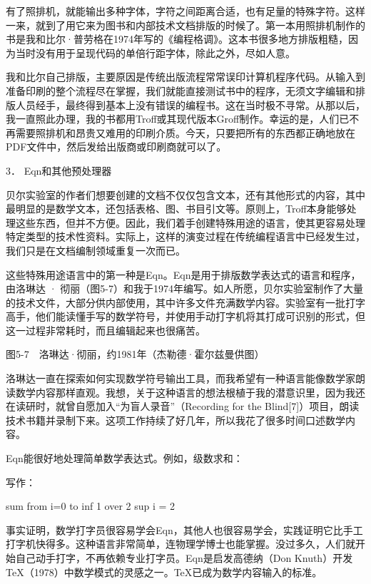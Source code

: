 \documentclass[a4paper,12pt,UTF8,twoside]{ctexbook}
\begin{document}
{{有了照排机，就能输出多种字体，字符之间距离合适，也有足量的特殊字符。这样一来，就到了用它来为图书和内部技术文档排版的时候了。第一本用照排机制作的书是我和比尔·普劳格在1974年写的《编程格调》。这本书很多地方排版粗糙，因为当时没有用于呈现代码的单倍行距字体，除此之外，尽如人意。

我和比尔自己排版，主要原因是传统出版流程常常误印计算机程序代码。从输入到准备印刷的整个流程尽在掌握，我们就能直接测试书中的程序，无须文字编辑和排版人员经手，最终得到基本上没有错误的编程书。这在当时极不寻常。从那以后，我一直照此办理，我的书都用Troff或其现代版本Groff制作。幸运的是，人们已不再需要照排机和昂贵又难用的印刷介质。今天，只要把所有的东西都正确地放在PDF文件中，然后发给出版商或印刷商就可以了。





3． Eqn和其他预处理器


贝尔实验室的作者们想要创建的文档不仅仅包含文本，还有其他形式的内容，其中最明显的是数学文本，还包括表格、图、书目引文等。原则上，Troff本身能够处理这些东西，但并不方便。因此，我们着手创建特殊用途的语言，使其更容易处理特定类型的技术性资料。实际上，这样的演变过程在传统编程语言中已经发生过，我们只是在文档编制领域重复一次而已。

这些特殊用途语言中的第一种是Eqn。Eqn是用于排版数学表达式的语言和程序，由洛琳达 · 彻丽（图5-7）和我于1974年编写。如人所愿，贝尔实验室制作了大量的技术文件，大部分供内部使用，其中许多文件充满数学内容。实验室有一批打字高手，他们能读懂手写的数学符号，并使用手动打字机将其打成可识别的形式，但这一过程非常耗时，而且编辑起来也很痛苦。



图5-7　洛琳达·彻丽，约1981年（杰勒德·霍尔兹曼供图）

洛琳达一直在探索如何实现数学符号输出工具，而我希望有一种语言能像数学家朗读数学内容那样直观。我想，关于这种语言的想法根植于我的潜意识里，因为我还在读研时，就曾自愿加入“为盲人录音”（Recording for the Blind[7]）项目，朗读技术书籍并录制下来。这项工作持续了好几年，所以我花了很多时间口述数学内容。

Eqn能很好地处理简单数学表达式。例如，级数求和：



写作：

sum from i=0 to inf 1 over 2 sup i = 2

事实证明，数学打字员很容易学会Eqn，其他人也很容易学会，实践证明它比手工打字机快得多。这种语言非常简单，连物理学博士也能掌握。没过多久，人们就开始自己动手打字，不再依赖专业打字员。Eqn是启发高德纳（Don Knuth）开发TeX（1978）中数学模式的灵感之一。TeX已成为数学内容输入的标准。

}}
\end{document}
